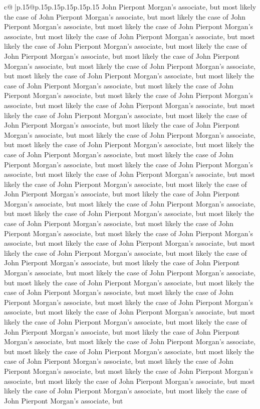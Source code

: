 \documentclass{article}
\begin{document}
{\begin{supertabular}{c@{$\;$}|p{.15\linewidth}@{}p{.15\linewidth}p{.15\linewidth}p{.15\linewidth}p{.15\linewidth}p{.15\linewidth}}
{{{John Pierpont Morgan's associate, but most likely the case of John Pierpont Morgan's associate, but most likely the case of John Pierpont Morgan's associate, but most likely the case of John Pierpont Morgan's associate, but most likely the case of John Pierpont Morgan's associate, but most likely the case of John Pierpont Morgan's associate, but most likely the case of John Pierpont Morgan's associate, but most likely the case of John Pierpont Morgan's associate, but most likely the case of John Pierpont Morgan's associate, but most likely the case of John Pierpont Morgan's associate, but most likely the case of John Pierpont Morgan's associate, but most likely the case of John Pierpont Morgan's associate, but most likely the case of John Pierpont Morgan's associate, but most likely the case of John Pierpont Morgan's associate, but most likely the case of John Pierpont Morgan's associate, but most likely the case of John Pierpont Morgan's associate, but most likely the case of John Pierpont Morgan's associate, but most likely the case of John Pierpont Morgan's associate, but most likely the case of John Pierpont Morgan's associate, but most likely the case of John Pierpont Morgan's associate, but most likely the case of John Pierpont Morgan's associate, but most likely the case of John Pierpont Morgan's associate, but most likely the case of John Pierpont Morgan's associate, but most likely the case of John Pierpont Morgan's associate, but most likely the case of John Pierpont Morgan's associate, but most likely the case of John Pierpont Morgan's associate, but most likely the case of John Pierpont Morgan's associate, but most likely the case of John Pierpont Morgan's associate, but most likely the case of John Pierpont Morgan's associate, but most likely the case of John Pierpont Morgan's associate, but most likely the case of John Pierpont Morgan's associate, but most likely the case of John Pierpont Morgan's associate, but most likely the case of John Pierpont Morgan's associate, but most likely the case of John Pierpont Morgan's associate, but most likely the case of John Pierpont Morgan's associate, but most likely the case of John Pierpont Morgan's associate, but most likely the case of John Pierpont Morgan's associate, but most likely the case of John Pierpont Morgan's associate, but most likely the case of John Pierpont Morgan's associate, but most likely the case of John Pierpont Morgan's associate, but most likely the case of John Pierpont Morgan's associate, but most likely the case of John Pierpont Morgan's associate, but most likely the case of John Pierpont Morgan's associate, but most likely the case of John Pierpont Morgan's associate, but most likely the case of John Pierpont Morgan's associate, but most likely the case of John Pierpont Morgan's associate, but most likely the case of John Pierpont Morgan's associate, but most likely the case of John Pierpont Morgan's associate, but most likely the case of John Pierpont Morgan's associate, but most likely the case of John Pierpont Morgan's associate, but most likely the case of John Pierpont Morgan's associate, but most likely the case of John Pierpont Morgan's associate, but }}}
\end{supertabular}}
\end{document}
